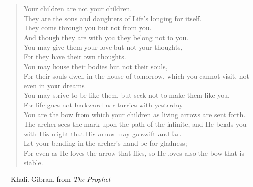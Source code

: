 \pagestyle{empty}



\vspace*{1.5in}

\begin{verse}
     Your children are not your children. \\
     They are the sons and daughters of Life's longing for
        itself. \\
     They come through you but not from you. \\
     And though they are with you they belong not to you. \\
     You may give them your love but not your thoughts, \\
     For they have their own thoughts.\\
    You may house their bodies but not their souls, \\
     For their souls dwell in the house of tomorrow, which you
        cannot visit, not even in your dreams. \\
    You may strive to be like them, but seek not to make
        them like you. \\
     For life goes not backward nor tarries with yesterday. \\ 
     You are the bow from which your children as living
        arrows are sent forth. \\
     The archer sees the mark upon the path of the infinite,
        and He bends you with His might that His arrow may
        go swift and far. \\ 
     Let your bending in the archer's hand be for gladness; \\
     For even as He loves the arrow that flies, so He loves also
        the bow that is stable. \\

\end{verse}

  \hskip 2in ---Khalil Gibran, from {\it The Prophet}







